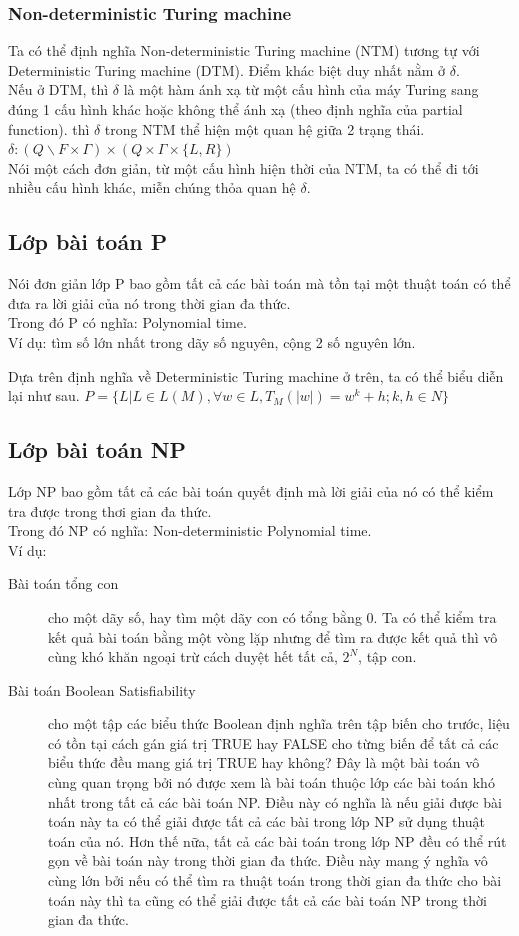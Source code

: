 \documentclass[a4paper 14pt]{extarticle}
\begin{document}
			\subsubsection{Non-deterministic Turing machine}
				Ta có thể định nghĩa Non-deterministic Turing machine (NTM) tương tự với Deterministic Turing machine (DTM). Điểm khác biệt duy nhất nằm ở $\delta$.\\
				Nếu ở DTM, thì $\delta$ là một hàm ánh xạ từ một cấu hình của máy Turing sang đúng 1 cấu hình khác hoặc không thể ánh xạ (theo định nghĩa của partial function). thì $\delta$ trong NTM thể hiện một quan hệ giữa 2 trạng thái.\\
				$\delta: (Q\backslash F \times \Gamma) \times (Q \times \Gamma \times \{L,R\})$\\
				Nói một cách đơn giản, từ một cấu hình hiện thời của NTM, ta có thể đi tới nhiều cấu hình khác, miễn chúng thỏa quan hệ $\delta$.
		\subsection{Lớp bài toán P}
			Nói đơn giản lớp P bao gồm tất cả các bài toán mà tồn tại một thuật toán có thể đưa ra lời giải của nó trong thời gian đa thức.\\
			Trong đó P có nghĩa: Polynomial time.\\
			Ví dụ: tìm số lớn nhất trong dãy số nguyên, cộng 2 số nguyên lớn.
			
			Dựa trên định nghĩa về Deterministic Turing machine ở trên, ta có thể biểu diễn lại như sau.
			$P = \{L| L \in L(M), \forall w \in L, T_M(|w|) = w^k + h; k,h \in N\}$
		\subsection{Lớp bài toán NP}
			Lớp NP bao gồm tất cả các bài toán quyết định mà lời giải của nó có thể kiểm tra được trong thơi gian đa thức.\\
			Trong đó NP có nghĩa: Non-deterministic Polynomial time.\\
			Ví dụ: 
			\begin{description}
				\item[Bài toán tổng con] cho một dãy số, hay tìm một dãy con có tổng bằng 0. Ta có thể kiểm tra kết quả bài toán bằng một vòng lặp nhưng để tìm ra được kết quả thì vô cùng khó khăn ngoại trừ cách duyệt hết tất cả, $2^N$, tập con.
				\item[Bài toán Boolean Satisfiability] \label{EX: NP-C} cho một tập các biểu thức Boolean định nghĩa trên tập biến cho trước, liệu có tồn tại cách gán giá trị TRUE hay FALSE cho từng biến để tất cả các biểu thức đều mang giá trị TRUE hay không? Đây là một bài toán vô cùng quan trọng bởi nó được xem là bài toán thuộc lớp các bài toán khó nhất trong tất cả các bài toán NP. Điều này có nghĩa là nếu giải được bài toán này ta có thể giải được tất cả các bài trong lớp NP sử dụng thuật toán của nó. Hơn thế nữa, tất cả các bài toán trong lớp NP đều có thể rút gọn về bài toán này trong thời gian đa thức. Điều này mang ý nghĩa vô cùng lớn bởi nếu có thể tìm ra thuật toán trong thời gian đa thức cho bài toán này thì ta cũng có thể giải được tất cả các bài toán NP trong thời gian đa thức.
			\end{description}
\end{document}
